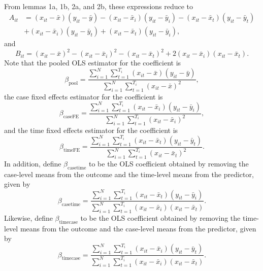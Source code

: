 \documentclass{article}[12pt]
\newenvironment{proof}[1][Proof.]{\begin{trivlist}
\item[\hskip \labelsep {\bfseries #1}]}{\end{trivlist}}
\begin{document}
\begin{proof}
\begin{align}
\end{align}
From lemmas 1a, 1b, 2a, and 2b, these expressions reduce to
\begin{align}
A_{it} & = (x_{it}  - \bar{x})(y_{it}  - \bar{y}) - (x_{it}  - \bar{x}_i)(y_{it}  - \bar{y}_i) - (x_{it}  - \bar{x}_t)(y_{it}  - \bar{y}_t) \nonumber\\
& + (x_{it}  - \bar{x}_i)(y_{it}  - \bar{y}_t) + (x_{it}  - \bar{x}_t)(y_{it}  - \bar{y}_i),
\end{align}
and
\begin{equation}
B_{it} =  (x_{it}  - \bar{x})^2 - (x_{it}  - \bar{x}_i)^2 - (x_{it}  - \bar{x}_t)^2 + 2(x_{it}  - \bar{x}_i)(x_{it}  - \bar{x}_t).
\end{equation}
Note that the pooled OLS estimator for the coefficient is
\begin{equation}
\beta_{\text{pool}} = \frac{\sum_{i=1}^N\sum_{t=1}^{T_i}(x_{it}-\bar{x})(y_{it}-\bar{y})}{\sum_{i=1}^N\sum_{t=1}^{T_i}(x_{it}-\bar{x})^2},
\end{equation}
the case fixed effects estimator for the coefficient is
\begin{equation}
\beta_{\text{caseFE}} = \frac{\sum_{i=1}^N\sum_{t=1}^{T_i}(x_{it}-\bar{x}_i)(y_{it}-\bar{y}_i)}{\sum_{i=1}^N\sum_{t=1}^{T_i}(x_{it}-\bar{x}_i)^2},
\end{equation}
and the time fixed effects estimator for the coefficient is
\begin{equation}
\beta_{\text{timeFE}} = \frac{\sum_{i=1}^N\sum_{t=1}^{T_i}(x_{it}-\bar{x}_t)(y_{it}-\bar{y}_t)}{\sum_{i=1}^N\sum_{t=1}^{T_i}(x_{it}-\bar{x}_t)^2}.
\end{equation}
In addition, define $\beta_{\text{casetime}}$ to be the OLS coefficient obtained by removing the case-level means from the outcome and the time-level means from the predictor, given by
\begin{equation}
\beta_{\text{casetime}} = \frac{\sum_{i=1}^N\sum_{t=1}^{T_i}(x_{it}-\bar{x}_t)(y_{it}-\bar{y}_i)}{\sum_{i=1}^N\sum_{t=1}^{T_i} (x_{it}-\bar{x}_i)(x_{it}-\bar{x}_t)}.
\end{equation}
Likewise, define $\beta_{\text{timecase}}$ to be the OLS coefficient obtained by removing the time-level means from the outcome and the case-level means from the predictor, given by
\begin{equation}
\beta_{\text{timecase}} = \frac{\sum_{i=1}^N\sum_{t=1}^{T_i}(x_{it}-\bar{x}_i)(y_{it}-\bar{y}_t)}{\sum_{i=1}^N\sum_{t=1}^{T_i}(x_{it}-\bar{x}_i)(x_{it}-\bar{x}_t)}.
\end{equation}

\end{proof}
\end{document}
